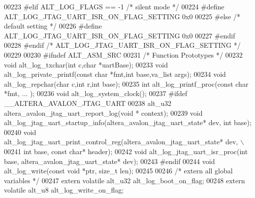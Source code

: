 \begin{DoxyCode}
{{{{00223 \textcolor{preprocessor}{        #elif ALT\_LOG\_FLAGS == -1 }\textcolor{comment}{/* silent mode */}\textcolor{preprocessor}{}
00224 \textcolor{preprocessor}{            #define ALT\_LOG\_JTAG\_UART\_ISR\_ON\_FLAG\_SETTING 0x0}
00225 \textcolor{preprocessor}{        #else }\textcolor{comment}{/* default setting */}\textcolor{preprocessor}{}
00226 \textcolor{preprocessor}{            #define ALT\_LOG\_JTAG\_UART\_ISR\_ON\_FLAG\_SETTING 0x0}
00227 \textcolor{preprocessor}{        #endif}
00228 \textcolor{preprocessor}{    #endif }\textcolor{comment}{/* ALT\_LOG\_JTAG\_UART\_ISR\_ON\_FLAG\_SETTING */}\textcolor{preprocessor}{}
00229 
00230 \textcolor{preprocessor}{#ifndef ALT\_ASM\_SRC}
00231     \textcolor{comment}{/* Function Prototypes */}
00232     \textcolor{keywordtype}{void} alt\_log\_txchar(\textcolor{keywordtype}{int} c,\textcolor{keywordtype}{char} *uartBase);
00233     \textcolor{keywordtype}{void} alt\_log\_private\_printf(\textcolor{keyword}{const} \textcolor{keywordtype}{char} *fmt,\textcolor{keywordtype}{int} base,va\_list args);
00234     \textcolor{keywordtype}{void} alt\_log\_repchar(\textcolor{keywordtype}{char} c,\textcolor{keywordtype}{int} r,\textcolor{keywordtype}{int} base);
00235     \textcolor{keywordtype}{int} alt\_log\_printf\_proc(\textcolor{keyword}{const} \textcolor{keywordtype}{char} *fmt, ... );
00236     \textcolor{keywordtype}{void} alt\_log\_system\_clock();
00237 \textcolor{preprocessor}{    #ifdef \_\_ALTERA\_AVALON\_JTAG\_UART }
00238         alt_u32 altera\_avalon\_jtag\_uart\_report\_log(\textcolor{keywordtype}{void} * context);
00239         \textcolor{keywordtype}{void} alt\_log\_jtag\_uart\_startup\_info(altera\_avalon\_jtag\_uart\_state* dev, \textcolor{keywordtype}{int} base);
00240         \textcolor{keywordtype}{void} alt\_log\_jtag\_uart\_print\_control\_reg(altera\_avalon\_jtag\_uart\_state* dev, \(\backslash\)
00241              \textcolor{keywordtype}{int} base, \textcolor{keyword}{const} \textcolor{keywordtype}{char}* header);
00242         \textcolor{keywordtype}{void} alt\_log\_jtag\_uart\_isr\_proc(\textcolor{keywordtype}{int} base, altera\_avalon\_jtag\_uart\_state* dev);
00243 \textcolor{preprocessor}{    #endif}
00244     \textcolor{keywordtype}{void} alt\_log\_write(\textcolor{keyword}{const} \textcolor{keywordtype}{void} *ptr, \textcolor{keywordtype}{size\_t} len);
00245     
00246     \textcolor{comment}{/* extern all global variables */}
00247     \textcolor{keyword}{extern} \textcolor{keyword}{volatile} alt_u32 alt\_log\_boot\_on\_flag;
00248     \textcolor{keyword}{extern} \textcolor{keyword}{volatile} alt_u8 alt\_log\_write\_on\_flag;
}}}}
\end{DoxyCode}
